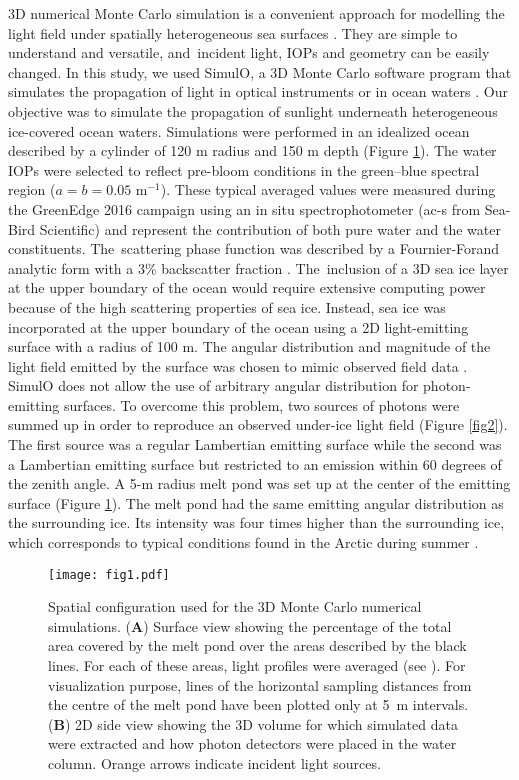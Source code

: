 \documentclass[applsci,article,accept,moreauthors,pdftex,10pt,a4paper]{Definitions/mdpi}
\begin{document}
3D numerical Monte Carlo simulation is a convenient approach for modelling the light field under spatially heterogeneous sea surfaces \citep{Mobley_ocean_optics_book, Petrich2012, Katlein2014, Katlein2016}. They are simple to understand and versatile, and~incident light, IOPs and geometry can be easily changed. In this study, we used SimulO, a 3D Monte Carlo software program that simulates the propagation of light in optical instruments or in ocean waters \citep{Leymarie2010}. Our objective was to simulate the propagation of sunlight underneath heterogeneous ice-covered ocean waters. Simulations were performed in an idealized ocean described by a cylinder of 120 m radius and 150 m depth (Figure \ref{fig1}). The water IOPs were selected to reflect pre-bloom conditions in the green--blue spectral region ($a = b = 0.05$ m$^{-1}$). These typical averaged values were measured during the GreenEdge 2016 campaign using an in situ spectrophotometer (ac-s from Sea-Bird Scientific) and represent the contribution of both pure water and the water constituents. The~scattering phase function was described by a Fournier-Forand analytic form with a 3\% backscatter fraction \citep{Fournier1994, Mobley2002}. The~inclusion of a 3D sea ice layer at the upper boundary of the ocean would require extensive computing power because of the high scattering properties of sea ice. Instead, sea ice was incorporated at the upper boundary of the ocean using a 2D light-emitting surface with a radius of 100 m. The angular distribution and magnitude of the light field emitted by the surface was chosen to mimic observed field data \citep{Girard2018}. SimulO does not allow the use of arbitrary angular distribution for photon-emitting surfaces. To overcome this problem, two sources of photons were summed up in order to reproduce an observed under-ice light field (Figure \ref{fig2}). The first source was a regular Lambertian emitting surface while the second was a Lambertian emitting surface but restricted to an emission within 60 degrees of the zenith angle. A 5-m radius melt pond was set up at the center of the emitting surface (Figure \ref{fig1}). The melt pond had the same emitting angular distribution as the surrounding ice. Its intensity was four times higher than the surrounding ice, which corresponds to typical conditions found in the Arctic during summer \citep{Perovich2016}.
\begin{figure}[H]
	\centering
	\texttt{[image: fig1.pdf]}
	\caption{Spatial configuration used for the 3D Monte Carlo numerical simulations. (\textbf{A}) Surface view showing the percentage of the total area covered by the melt pond over the areas described by the black lines. For each of these areas, light profiles were averaged (see ). 
	For visualization purpose, lines of the horizontal sampling distances from the centre of the melt pond have been plotted only at 5~m intervals. (\textbf{B}) 2D side view showing the 3D volume for which simulated data were extracted and how photon detectors were placed in the water column. Orange arrows indicate incident light sources.}
	\label{fig1}
\end{figure}
\end{document}
